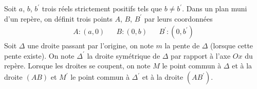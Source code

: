 Soit $a$, $b$, $b^\prime$ trois réels strictement positifs tels que $b\neq b^\prime$. Dans un plan muni d'un repère, on définit trois points $A$, $B$, $B^\prime$ par leurs coordonnées 
\begin{align*}
 A : (a,0) & & B : (0,b) & & B^\prime : (0,b^{\prime})
\end{align*}
Soit $\Delta$ une droite passant par l'origine, on note $m$ la pente de $\Delta$ (lorsque cette pente existe).\newline
On note $\Delta^{\prime}$ la droite symétrique de $\Delta$ par rapport à l'axe $Ox$ du repère.\newline
Lorsque les droites se coupent, on note $M$ le point commun à $\Delta$ et à la droite $(AB)$ et $M^{\prime}$ le point commun à $\Delta^{\prime}$ et à la droite $(AB^{\prime})$.
